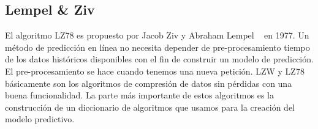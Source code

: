  
\subsection{Lempel \& Ziv }


El algoritmo LZ78 es propuesto por Jacob Ziv y Abraham Lempel ~\cite{ZivLempel1977} en 1977. Un método de predicción en línea no necesita depender de pre-procesamiento tiempo de los datos históricos disponibles con el fin de construir un modelo de predicción. El pre-procesamiento se hace cuando tenemos una nueva petición. LZW y LZ78 básicamente son los algoritmos de compresión de datos sin pérdidas con una buena funcionalidad. La parte más importante de estos algoritmos es la construcción de un diccionario de algoritmos que usamos para la creación del modelo predictivo. 










